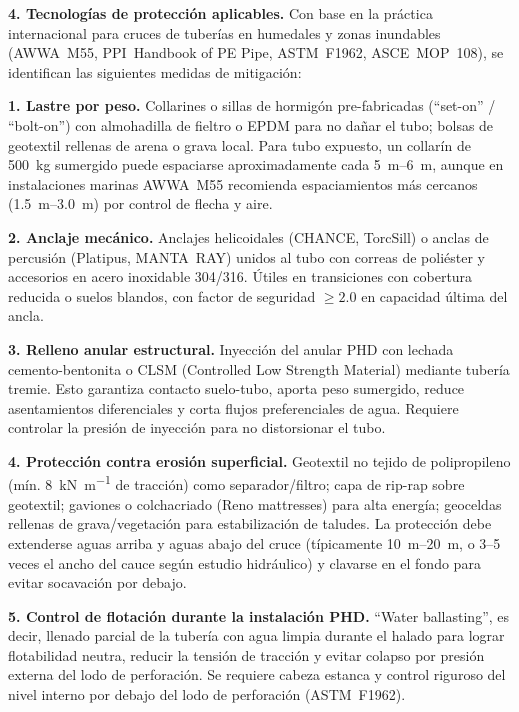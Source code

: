 \textbf{4. Tecnologías de protección aplicables.} Con base en la práctica internacional para cruces de tuberías en humedales y zonas inundables (AWWA~M55, PPI~Handbook of PE Pipe, ASTM~F1962, ASCE~MOP~108), se identifican las siguientes medidas de mitigación:

\textbf{1. Lastre por peso.} Collarines o sillas de hormigón pre-fabricadas (``set-on'' / ``bolt-on'') con almohadilla de fieltro o EPDM para no dañar el tubo; bolsas de geotextil rellenas de arena o grava local. Para tubo expuesto, un collarín de \SI{500}{\kilogram} sumergido puede espaciarse aproximadamente cada \SI{5}{\meter}--\SI{6}{\meter}, aunque en instalaciones marinas AWWA~M55 recomienda espaciamientos más cercanos (\SI{1.5}{\meter}--\SI{3.0}{\meter}) por control de flecha y aire.

\textbf{2. Anclaje mecánico.} Anclajes helicoidales (CHANCE, TorcSill) o anclas de percusión (Platipus, MANTA~RAY) unidos al tubo con correas de poliéster y accesorios en acero inoxidable 304/316. Útiles en transiciones con cobertura reducida o suelos blandos, con factor de seguridad $\geq 2.0$ en capacidad última del ancla.

\textbf{3. Relleno anular estructural.} Inyección del anular PHD con lechada cemento-bentonita o CLSM (Controlled Low Strength Material) mediante tubería tremie. Esto garantiza contacto suelo-tubo, aporta peso sumergido, reduce asentamientos diferenciales y corta flujos preferenciales de agua. Requiere controlar la presión de inyección para no distorsionar el tubo.

\textbf{4. Protección contra erosión superficial.} Geotextil no tejido de polipropileno (mín. \SI{8}{\kilo\newton\per\meter} de tracción) como separador/filtro; capa de rip-rap sobre geotextil; gaviones o colchacriado (Reno mattresses) para alta energía; geoceldas rellenas de grava/vegetación para estabilización de taludes. La protección debe extenderse aguas arriba y aguas abajo del cruce (típicamente \SI{10}{\meter}--\SI{20}{\meter}, o 3--5 veces el ancho del cauce según estudio hidráulico) y clavarse en el fondo para evitar socavación por debajo.

\textbf{5. Control de flotación durante la instalación PHD.} ``Water ballasting'', es decir, llenado parcial de la tubería con agua limpia durante el halado para lograr flotabilidad neutra, reducir la tensión de tracción y evitar colapso por presión externa del lodo de perforación. Se requiere cabeza estanca y control riguroso del nivel interno por debajo del lodo de perforación (ASTM~F1962).

